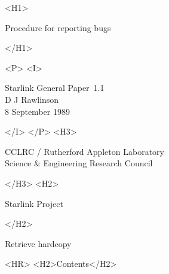 \documentclass[twoside,11pt]{article}
\newcommand{\stardoccategory}  {Starlink General Paper}
\newcommand{\stardocnumber}    {1.1}
\newcommand{\stardocauthors}   {D J Rawlinson}
\newcommand{\stardocdate}      {8 September 1989}
\newcommand{\stardoctitle}     {Procedure for reporting bugs}
\newcommand{\htmladdnormallink}[2]{#1}
\newcommand{\htmladdimg}[1]{}
\newcommand{\htmlref}[2]{#1}
\newcommand{\htmladdtonavigation}[1]{}
\newcommand{\xlabel}[1]{}
\newcommand{\latexonlytoc}[0]{\tableofcontents}
\begin{document}
\begin{htmlonly}
   \xlabel{}
   \begin{rawhtml} <H1> \end{rawhtml}
      \stardoctitle
   \begin{rawhtml} </H1> \end{rawhtml}


   \begin{rawhtml} <P> <I> \end{rawhtml}
   \stardoccategory\ \stardocnumber \\
   \stardocauthors \\
   \stardocdate
   \begin{rawhtml} </I> </P> <H3> \end{rawhtml}
      \htmladdnormallink{CCLRC}{http://www.cclrc.ac.uk} /
      \htmladdnormallink{Rutherford Appleton Laboratory}
                        {http://www.cclrc.ac.uk/ral} \\
      \htmladdnormallink{Science \& Engineering Research Council}
                        {http://www.pparc.ac.uk} \\
   \begin{rawhtml} </H3> <H2> \end{rawhtml}
      \htmladdnormallink{Starlink Project}{http://www.starlink.ac.uk/}
   \begin{rawhtml} </H2> \end{rawhtml}
   \htmladdnormallink{\htmladdimg{source.gif} Retrieve hardcopy}
      {http://www.starlink.ac.uk/cgi-bin/hcserver?\stardocsource}\\

  \label{stardoccontents}
  \begin{rawhtml} 
    <HR>
    <H2>Contents</H2>
  \end{rawhtml}
  \newcommand{\latexonlytoc}[0]{}
  \htmladdtonavigation{\htmlref{\htmladdimg{contents_motif.gif}}
        {stardoccontents}}


\end{htmlonly}
\end{document}

